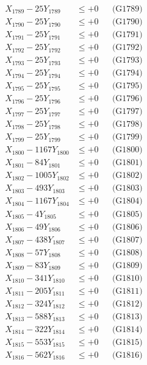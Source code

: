 \documentclass[a4paper,10pt]{article}
\begin{document}
{\begin{align}
X_{1789} - 25Y_{1789} &\leq +0 && \text{(G1789)} \\
X_{1790} - 25Y_{1790} &\leq +0 && \text{(G1790)} \\
\allowbreak
X_{1791} - 25Y_{1791} &\leq +0 && \text{(G1791)} \\
X_{1792} - 25Y_{1792} &\leq +0 && \text{(G1792)} \\
X_{1793} - 25Y_{1793} &\leq +0 && \text{(G1793)} \\
X_{1794} - 25Y_{1794} &\leq +0 && \text{(G1794)} \\
X_{1795} - 25Y_{1795} &\leq +0 && \text{(G1795)} \\
X_{1796} - 25Y_{1796} &\leq +0 && \text{(G1796)} \\
X_{1797} - 25Y_{1797} &\leq +0 && \text{(G1797)} \\
X_{1798} - 25Y_{1798} &\leq +0 && \text{(G1798)} \\
X_{1799} - 25Y_{1799} &\leq +0 && \text{(G1799)} \\
X_{1800} - 1167Y_{1800} &\leq +0 && \text{(G1800)} \\
\allowbreak
X_{1801} - 84Y_{1801} &\leq +0 && \text{(G1801)} \\
X_{1802} - 1005Y_{1802} &\leq +0 && \text{(G1802)} \\
X_{1803} - 493Y_{1803} &\leq +0 && \text{(G1803)} \\
X_{1804} - 1167Y_{1804} &\leq +0 && \text{(G1804)} \\
X_{1805} - 4Y_{1805} &\leq +0 && \text{(G1805)} \\
X_{1806} - 49Y_{1806} &\leq +0 && \text{(G1806)} \\
X_{1807} - 438Y_{1807} &\leq +0 && \text{(G1807)} \\
X_{1808} - 57Y_{1808} &\leq +0 && \text{(G1808)} \\
X_{1809} - 83Y_{1809} &\leq +0 && \text{(G1809)} \\
X_{1810} - 341Y_{1810} &\leq +0 && \text{(G1810)} \\
\allowbreak
X_{1811} - 205Y_{1811} &\leq +0 && \text{(G1811)} \\
X_{1812} - 324Y_{1812} &\leq +0 && \text{(G1812)} \\
X_{1813} - 588Y_{1813} &\leq +0 && \text{(G1813)} \\
X_{1814} - 322Y_{1814} &\leq +0 && \text{(G1814)} \\
X_{1815} - 553Y_{1815} &\leq +0 && \text{(G1815)} \\
X_{1816} - 562Y_{1816} &\leq +0 && \text{(G1816)} \\

\end{align}}
\end{document}
